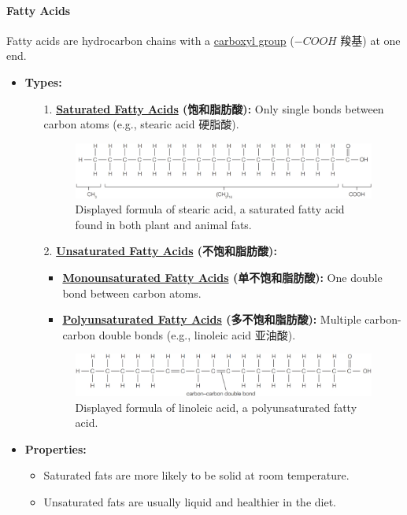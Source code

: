 \paragraph{Fatty Acids} Fatty acids are hydrocarbon chains with a \underline{carboxyl group} ($-COOH$ 羧基) at one end.
\begin{itemize}
    \item \textbf{Types:}
    \begin{itemize}
        \item[1.] \textbf{\underline{Saturated Fatty Acids} (饱和脂肪酸):} Only single bonds between carbon atoms (e.g., stearic
        acid 硬脂酸).
        \begin{figure}[H]
            \centering
            \includegraphics[scale=0.28]{Biology/1A/Images/1A-4-2.png}
            \caption{Displayed formula of stearic acid, a saturated fatty acid found in both plant and animal fats.}
        \end{figure}
        \item[2.] \textbf{\underline{Unsaturated Fatty Acids} (不饱和脂肪酸):}
        \begin{itemize}
            \item \textbf{\underline{Monounsaturated Fatty Acids} (单不饱和脂肪酸):} One double bond between carbon atoms.
            \item \textbf{\underline{Polyunsaturated Fatty Acids} (多不饱和脂肪酸):} Multiple carbon-carbon double bonds
            (e.g., linoleic acid 亚油酸).
        \end{itemize}
        \begin{figure}[H]
            \centering
            \includegraphics[scale=0.28]{Biology/1A/Images/1A-4-3.png}
            \caption{Displayed formula of linoleic acid, a polyunsaturated fatty acid.}
        \end{figure}
    \end{itemize}
    \item \textbf{Properties:}
    \begin{itemize}
        \item Saturated fats are more likely to be solid at room temperature.
        \item Unsaturated fats are usually liquid and healthier in the diet.
    \end{itemize}
\end{itemize}

